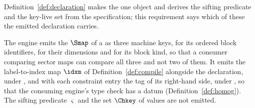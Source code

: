 
Definition~\ref{def:declaration} makes the  one object and
derives the sifting predicate and the key-live set from the specification;
this requirement says which of these the emitted declaration carries.

\begin{requirement}\label{req:declaration-keys}
The engine emits the  $\Smap$ of a
 as three machine keys,
 for its ordered block identifiers,
 for their dimensions and  for
its block kind, so that a consumer comparing sector maps can compare all
three and not two of them. It emits the label-to-index map $\idxm$ of
Definition~\ref{def:compile} alongside the declaration, under
, and with each constraint entry the tag of its
right-hand side, under , so that the consuming
engine's type check has a datum (Definition~\ref{def:homog}). The sifting
predicate $\varsigma$ and the set $\Chkey$ of  values are not
emitted.
\end{requirement}
